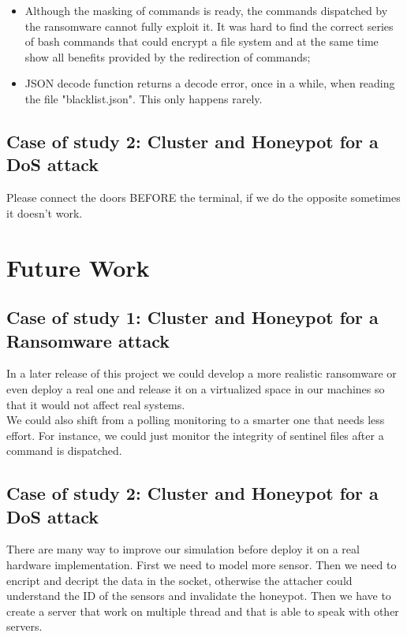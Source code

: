 \begin{itemize}
  \item Although the masking of commands is ready, the commands dispatched by the ransomware cannot fully exploit it. It was hard to find the correct series of bash commands that could encrypt a file system and at the same time show all benefits provided by the redirection of commands;
  \item JSON decode function returns a decode error, once in a while, when reading the file "blacklist.json". This only happens rarely.
\end{itemize}

\subsection{Case of study 2: Cluster and Honeypot for a DoS attack}

Please connect the doors BEFORE the terminal, if we do the opposite sometimes it doesn't work.  


\section{Future Work}

\subsection{Case of study 1: Cluster and Honeypot for a Ransomware attack}

In a later release of this project we could develop a more realistic ransomware or even deploy a real one and release it on a virtualized space in our machines so that it would not affect real systems.\\
We could also shift from a polling monitoring to a smarter one that needs less effort. For instance, we could just monitor the integrity of sentinel files after a command is dispatched.

\subsection{Case of study 2: Cluster and Honeypot for a DoS attack}
There are many way to improve our simulation before deploy it on a real hardware implementation. First we need to model more sensor. Then we need to encript and decript the data in the socket, otherwise the attacher could understand the ID of the sensors and invalidate the honeypot. Then we have to create a server that work on multiple thread and that is able to speak with other servers. 